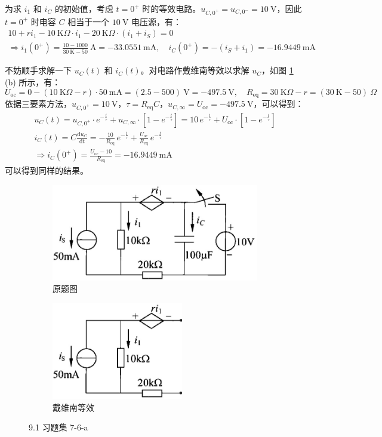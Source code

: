\documentclass[UTF8]{report}
\def\K{\ \mathrm{K}}
\def\mA{\ \mathrm{mA}}
\def\kO{\ \mathrm{K}\Omega}
\def\KO{\ \mathrm{K}\Omega}
\theoremstyle{MyLineTheoremStyle} %
\theoremstyle{MyBlockTheoremStyle} %
\theoremstyle{MySubsubsectionStyle} %
\begin{document}
为求 $i_1$ 和 $i_C$ 的初始值，考虑 $t = 0^+$ 时的等效电路。$u_{C, 0^+} = u_{C, 0^-} = 10 \ \mathrm{V}$，因此 $t = 0^+$ 时电容 $C$ 相当于一个 $10 \ \mathrm{V}$ 电压源，有：
\begin{gather}
10 + ri_1 - 10 \KO \cdot i_1 - 20\kO \cdot (i_1 + i_S) = 0 \\
\Longrightarrow 
\boxed{
    i_1(0^+) = \frac{10 - 1000}{30\K - 50} \ \mathrm{A} = -33.0551 \mA,\quad i_C(0^+) = -(i_S + i_1) =  -16.9449 \mA
}
\end{gather}

不妨顺手求解一下 $u_C(t)$ 和 $i_C(t)$。对电路作戴维南等效以求解 $u_C$，如图 \ref{9.1 习题集 7-6} (b) 所示，有：
\begin{equation}
U_{\text{oc}} =  0 - (10 \kO - r)\cdot 50\mA = (2.5 - 500) \ \mathrm{V} = - 497.5 \ \mathrm{V},\quad R_{\text{eq}} = 30\kO - r = (30\K - 50) \ \Omega
\end{equation}
依据三要素方法，$u_{C, 0^+} = 10 \ \mathrm{V}$，$\tau = R_{\text{eq}}C$，$u_{C,\infty} = U_{\text{oc}} = - 497.5 \ \mathrm{V}$，可以得到：
\begin{gather}
u_C (t) = u_{C, 0^+}\cdot e^{-\frac{t}{\tau}} + u_{C,\infty}\cdot \left[1 - e^{-\frac{t}{\tau}}\right] = 10 \,e^{-\frac{t}{\tau}} +  U_{\text{oc}}\cdot \left[1 - e^{-\frac{t}{\tau}}\right] \\ 
i_C (t) = C\frac{\mathrm{d} u_C }{\mathrm{d} t }
= -\frac{10}{R_{\text{eq}}} \,e^{-\frac{t}{\tau}} + \frac{U_{\text{oc}}}{R_{\text{eq}}} \,e^{-\frac{t}{\tau}} \\ 
\Longrightarrow i_C (0^+) = \frac{U_{\text{oc}} - 10}{R_{\text{eq}}} = -16.9449 \mA
\end{gather}
可以得到同样的结果。

\begin{figure}[H]\centering
\begin{subfigure}[b]{0.5\columnwidth}\centering
    \includegraphics[height=120pt]{assets/9/9.1 (a).png}
    \caption{原题图}
\end{subfigure}\hfill
\begin{subfigure}[b]{0.5\columnwidth}\centering
    \includegraphics[height=120pt]{assets/9/9.1 (b).png}
    \caption{戴维南等效}
\end{subfigure}
\caption{9.1 习题集 7-6-a}
\label{9.1 习题集 7-6}
\end{figure}
\end{document}
